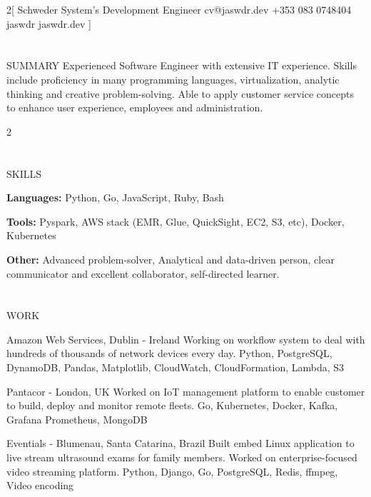 \documentclass{my_cv}
\begin{document}
\begin{multicols}{2}[
        {Schweder}%
        {System's Development Engineer}%
        {cv@jaswdr.dev}%
        {+353 083 0748404}%
        {jaswdr}%
        {jaswdr.dev}%
]
\end{multicols}

\section{\faFileText}{SUMMARY}
Experienced Software Engineer with extensive IT experience. Skills include proficiency in many programming languages, virtualization, analytic thinking and creative problem-solving. Able to apply customer service concepts to enhance user experience, employees and administration.

\begin{multicols}{2}

\section{\faList}{SKILLS}

\textbf{Languages:} Python, Go, JavaScript, Ruby, Bash

\noindent\textbf{Tools:} Pyspark, AWS stack (EMR, Glue, QuickSight, EC2, S3, etc), Docker, Kubernetes

\noindent\textbf{Other:} Advanced problem-solver, Analytical and data-driven person, clear communicator and excellent collaborator, self-directed learner.

\section{\faPencil}{WORK}

%
    {Amazon Web Services, Dublin - Ireland}%
    {Working on workflow system to deal with hundreds of thousands of network devices every day.}
    {Python, PostgreSQL, DynamoDB, Pandas, Matplotlib, CloudWatch, CloudFormation, Lambda, S3}

%
    {Pantacor - London, UK}%
    {Worked on IoT management platform to enable customer to build, deploy and monitor remote fleets.}%
    {Go, Kubernetes, Docker, Kafka, Grafana Prometheus, MongoDB}

%
    {Eventials - Blumenau, Santa Catarina, Brazil}%
    {Built embed Linux application to live stream ultrasound exams for family members. Worked on enterprise-focused video streaming platform.}%
    {Python, Django, Go, PostgreSQL, Redis, ffmpeg, Video encoding}


\end{multicols}
\end{document}
